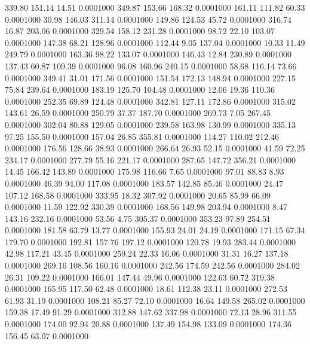  339.80  151.14   14.51   0.0001000
 349.87  153.66  168.32   0.0001000
 161.11  111.82   60.33   0.0001000
  30.98  146.03  311.14   0.0001000
 149.86  124.53   45.72   0.0001000
 316.74   16.87  203.06   0.0001000
 329.54  158.12  231.28   0.0001000
  98.72   22.10  103.07   0.0001000
 147.38   68.21  128.96   0.0001000
 112.44    9.05  137.04   0.0001000
  10.33   11.49  249.79   0.0001000
 163.36   98.22  133.07   0.0001000
 146.43   12.84  230.89   0.0001000
 137.43   60.87  109.39   0.0001000
  96.08  160.96  240.15   0.0001000
  58.68  116.14   73.66   0.0001000
 349.41   31.01  171.56   0.0001000
 151.54  172.13  148.94   0.0001000
 227.15   75.84  239.64   0.0001000
 183.19  125.70  104.48   0.0001000
  12.06   19.36  110.36   0.0001000
 252.35   69.89  124.48   0.0001000
 342.81  127.11  172.86   0.0001000
 315.02  143.61   26.59   0.0001000
 250.79   37.37  187.70   0.0001000
 269.73    7.05  267.45   0.0001000
 302.04   80.88  129.05   0.0001000
 239.58  163.98  130.99   0.0001000
 335.13   97.25  155.50   0.0001000
 157.04   26.85  355.81   0.0001000
 114.27  110.02  212.46   0.0001000
 176.56  128.66   38.93   0.0001000
 266.64   26.93   52.15   0.0001000
  41.59   72.25  234.17   0.0001000
 277.79   55.16  221.17   0.0001000
 287.65  147.72  356.21   0.0001000
  14.45  166.42  143.89   0.0001000
 175.98  116.66    7.65   0.0001000
  97.01   88.83    8.93   0.0001000
  46.39   94.00  117.08   0.0001000
 183.57  142.85   85.46   0.0001000
  24.47  107.12  168.58   0.0001000
 333.95   18.32  307.92   0.0001000
  20.65   85.99   66.09   0.0001000
  11.59  122.92  330.39   0.0001000
 168.56  149.98  203.94   0.0001000
   8.47  143.16  232.16   0.0001000
  53.56    4.75  305.37   0.0001000
 353.23   97.89  254.51   0.0001000
 181.58   63.79   13.77   0.0001000
 155.93   24.01   24.19   0.0001000
 171.15   67.34  179.70   0.0001000
 192.81  157.76  197.12   0.0001000
 120.78   19.93  283.44   0.0001000
  42.98  117.21   43.45   0.0001000
 259.24   22.33   16.06   0.0001000
  31.31   16.27  137.18   0.0001000
 269.16  108.56  160.16   0.0001000
 242.56  174.59  242.56   0.0001000
 284.02   26.31  109.22   0.0001000
 166.01  147.44   49.96   0.0001000
 122.63   60.72  319.38   0.0001000
 165.95  117.50   62.48   0.0001000
  18.61  112.38   23.11   0.0001000
 272.53   61.93   31.19   0.0001000
 108.21   85.27   72.10   0.0001000
  16.64  149.58  265.02   0.0001000
 159.38   17.49   91.29   0.0001000
 312.88  147.62  337.98   0.0001000
  72.13   28.96  311.55   0.0001000
 174.00   92.94   20.88   0.0001000
 137.49  154.98  133.09   0.0001000
 174.36  156.45   63.07   0.0001000
